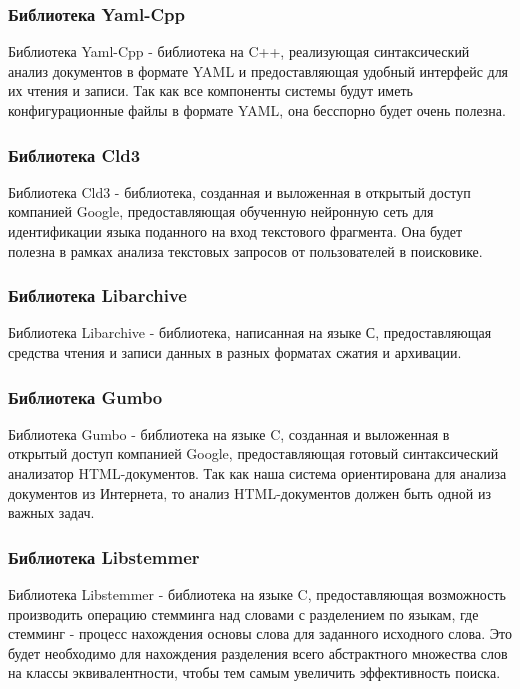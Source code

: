 \subsubsection{Библиотека Yaml-Cpp}

Библиотека Yaml-Cpp - библиотека на C++, реализующая синтаксический анализ документов в формате YAML и предоставляющая удобный интерфейс для их чтения и записи. Так как все компоненты системы будут иметь конфигурационные файлы в формате YAML, она бесспорно будет очень полезна.

\subsubsection{Библиотека Cld3}

Библиотека Cld3 - библиотека, созданная и выложенная в открытый доступ компанией Google, предоставляющая обученную нейронную сеть для идентификации языка поданного на вход текстового фрагмента. Она будет полезна в рамках анализа текстовых запросов от пользователей в поисковике.

\subsubsection{Библиотека Libarchive}

Библиотека Libarchive - библиотека, написанная на языке С, предоставляющая средства чтения и записи данных в разных форматах сжатия и архивации.

\subsubsection{Библиотека Gumbo}

Библиотека Gumbo - библиотека на языке C, созданная и выложенная в открытый доступ компанией Google, предоставляющая готовый синтаксический анализатор HTML-документов. Так как наша система ориентирована для анализа документов из Интернета, то анализ HTML-документов должен быть одной из важных задач. 

\subsubsection{Библиотека Libstemmer}

Библиотека Libstemmer - библиотека на языке C, предоставляющая возможность производить операцию стемминга над словами с разделением по языкам, где стемминг - процесс нахождения основы слова для заданного исходного слова. Это будет необходимо для нахождения разделения всего абстрактного множества слов на классы эквивалентности, чтобы тем самым увеличить эффективность поиска. 

